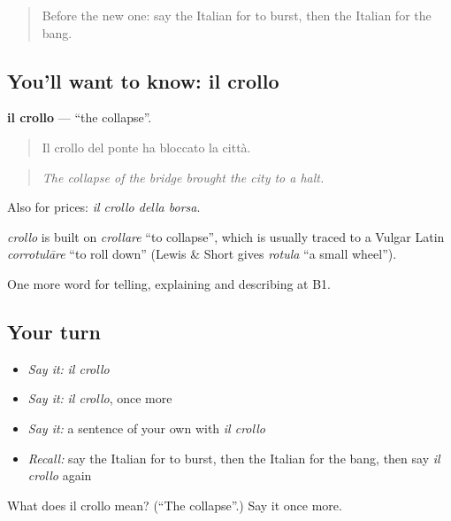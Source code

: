 \label{lesson:IT-C303-crollo}



\begin{quote}
Before the new one: say the Italian for to burst, then the Italian for the bang.
\end{quote}

\subsection*{You'll want to know: il crollo}
\textbf{il crollo} — \textquotedblleft{}the collapse\textquotedblright{}.

\begin{quote}
Il crollo del ponte ha bloccato la città.
\end{quote}

\begin{quote}
\emph{The collapse of the bridge brought the city to a halt.}
\end{quote}

Also for prices: \emph{il crollo della borsa}.

\begin{cousinweb}
\emph{crollo} is built on \emph{crollare} \textquotedblleft{}to collapse\textquotedblright{}, which is usually traced to a Vulgar Latin \emph{corrotulāre} \textquotedblleft{}to roll down\textquotedblright{} (Lewis \& Short gives \emph{rotula} \textquotedblleft{}a small wheel\textquotedblright{}).
\end{cousinweb}

\begin{grammarlens}[title={What you've built}]
One more word for telling, explaining and describing at B1.
\end{grammarlens}

\subsection*{Your turn}
\begin{itemize}
\raggedright
  \item \emph{Say it:} \emph{il crollo}
  \item \emph{Say it:} \emph{il crollo}, once more
  \item \emph{Say it:} a sentence of your own with \emph{il crollo}
  \item \emph{Recall:} say the Italian for to burst, then the Italian for the bang, then say \emph{il crollo} again
\end{itemize}

\begin{tcolorbox}[breakable,colback=teal!4,colframe=teal!35!black,title={Before you move on}]
What does il crollo mean? (\textquotedblleft{}The collapse\textquotedblright{}.) Say it once more.
\end{tcolorbox}
